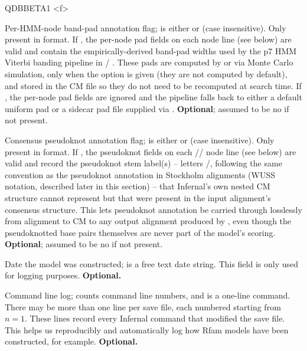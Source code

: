 \begin{sreitems}{QDBBETA1 <f>}
\item [\emprog{P7NODEPAD <s>}] Per-HMM-node band-pad annotation flag;
 is either  or  (case insensitive). Only
present in  format. If , the per-node pad
fields on each node line (see below) are valid and contain the
empirically-derived band-pad widths used by the p7 HMM Viterbi banding
pipeline in  / . These pads are computed
by  or  via Monte Carlo simulation, only
when the  option is given (they are not computed by
default), and stored in the CM file so they do not need to be
recomputed at search time. If
, the per-node pad fields are ignored and the pipeline falls
back to either a default uniform pad or a sidecar pad file supplied via
. \textbf{Optional}; assumed to be no if not
present.

\item [\emprog{PKNOT <s>}] Consensus pseudoknot annotation flag;
 is either  or  (case insensitive). Only
present in  format. If , the
pseudoknot fields on each // node line
(see below) are valid and record the pseudoknot stem label(s) --
letters /, following the same convention as the
 pseudoknot annotation in Stockholm alignments
(WUSS notation, described later in this section) -- that Infernal's
own nested CM structure
cannot represent but that were present in the input alignment's
consensus structure. This lets pseudoknot annotation be carried through
losslessly from alignment to CM to any output alignment produced by
, even though the pseudoknotted base pairs themselves are
never part of the model's scoring. \textbf{Optional}; assumed to be no
if not present.

\item [\emprog{DATE <s>}] Date the model was constructed; 
is a free text date string.  This field is only used for logging
purposes. \textbf{Optional.}

\item [\emprog{COM [<n>] <s>}] Command line log;  counts
command line numbers, and  is a one-line command. There may
be more than one  line per save file, each numbered starting
from $n=1$. These lines record every Infernal command that modified the
save file. This helps us reproducibly and automatically log how Rfam
models have been constructed, for example. \textbf{Optional.}


\end{sreitems}
